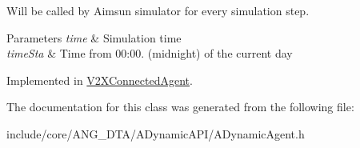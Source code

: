 Will be called by Aimsun simulator for every simulation step. 


\begin{DoxyParams}{Parameters}
{\em time} & Simulation time \\
\hline
{\em time\+Sta} & Time from 00\+:00. (midnight) of the current day \\
\hline
\end{DoxyParams}


Implemented in \hyperlink{classV2XConnectedAgent_a771b23c38e5ac18d0219d4d8fefccb5a}{V2\+X\+Connected\+Agent}.



The documentation for this class was generated from the following file\+:\begin{DoxyCompactItemize}
\item 
include/core/\+A\+N\+G\+\_\+\+D\+T\+A/\+A\+Dynamic\+A\+P\+I/A\+Dynamic\+Agent.\+h\end{DoxyCompactItemize}
